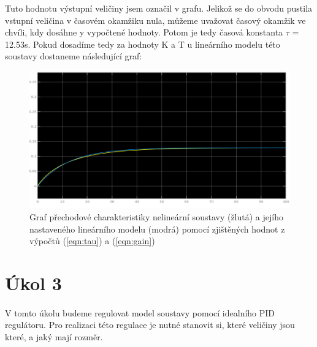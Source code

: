 \documentclass{article}
\begin{document}
   	\indent Tuto hodnotu výstupní veličiny jsem označil v grafu. Jelikož se do obvodu pustila vstupní veličina v časovém okamžiku nula, můžeme uvažovat časový okamžik ve chvíli, kdy dosáhne y vypočtené hodnoty. Potom je tedy časová konstanta $\tau$ = 12.53s.
 	\indent Pokud dosadíme tedy za hodnoty K a T u lineárního modelu této soustavy dostaneme následující graf:
 	
 	\begin{figure}[H]
 	\includegraphics[width=\textwidth]{ukol2meas2}
 	\caption{Graf přechodové charakteristiky nelineární soustavy (žlutá) a jejího nastaveného lineárního modelu (modrá) pomocí zjištěných hodnot z výpočtů (\ref{eqn:tau}) a (\ref{eqn:gain})}
 	\end{figure}
   			
   	
   	\section{Úkol 3}
   	\paragraph{}
   		V tomto úkolu budeme regulovat model soustavy pomocí idealního PID regulátoru. Pro realizaci této regulace je nutné stanovit si, které veličiny jsou které, a jaký mají rozměr.
   		
\begin{table}[H]
\centering
{}
\caption{Veličiny regulační smyčky}
\label{tab:regtable}
\end{table}
   	
\end{document}
